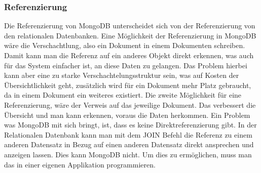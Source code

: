 \subsubsection{Referenzierung}
Die Referenzierung von MongoDB unterscheidet sich von der Referenzierung von den relationalen Datenbanken. Eine Möglichkeit der Referenzierung in MongoDB wäre die Verschachtlung, also ein Dokument in einem Dokumenten schreiben. Damit kann man die Referenz auf ein anderes Objekt direkt erkennen, was auch für das System einfacher ist, an diese Daten zu gelangen. Das Problem hierbei kann aber eine zu starke Verschachtelungsstruktur sein, was auf Kosten der Übersichtlichkeit geht, zusätzlich wird für ein Dokument mehr Platz gebraucht, da in einem Dokument ein weiteres existiert. Die zweite Möglichkeit für eine Referenzierung, wäre der Verweis auf das jeweilige Dokument. Das verbessert die Übersicht und man kann erkennen, voraus die Daten herkommen. Ein Problem was MongoDB mit sich bringt, ist, dass es keine Direktreferenzierung gibt. In der Relationalen Datenbank kann man mit dem JOIN Befehl die Referenz zu einem anderen Datensatz in Bezug auf einen anderen Datensatz direkt ansprechen und anzeigen lassen. Dies kann MongoDB nicht. Um dies zu ermöglichen, muss man das in einer eigenen Applikation programmieren. 
